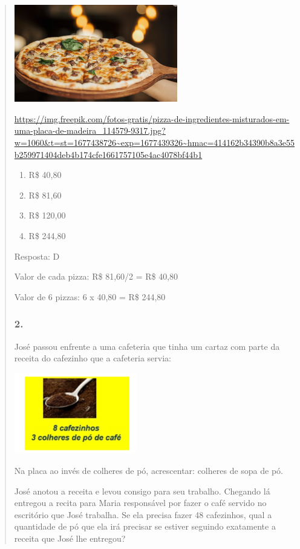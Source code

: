 \begin{enumerate}
\begin{escolha}
\begin{enumerate}
\begin{itemize}
\begin{itemize}
\begin{escolha}
\begin{quote}
\begin{escolha}
{\includegraphics[width=2.80000in,height=1.66867in]{media/image132.png}

\url{https://img.freepik.com/fotos-gratis/pizza-de-ingredientes-misturados-em-uma-placa-de-madeira_114579-9317.jpg?w=1060\&t=st=1677438726~exp=1677439326~hmac=414162b34390b8a3e55b259971404deb4b174cfe1661757105e4ac4078bf44b1}

\begin{enumerate}
\def\labelenumi{\alph{enumi})}
\item
  R\$ 40,80
\item
  R\$ 81,60
\item
  R\$ 120,00
\item
  R\$ 244,80
\end{enumerate}

Resposta: D

Valor de cada pizza: R\$ 81,60/2 = R\$ 40,80

Valor de 6 pizzas: 6 x 40,80 = R\$ 244,80

\subsubsection{2.}\label{section-128}

José passou enfrente a uma cafeteria que tinha um cartaz com parte da
receita do cafezinho que a cafeteria servia:

\includegraphics[width=2.10018in,height=1.39179in]{media/image133.png}

Na placa ao invés de colheres de pó, acrescentar: colheres de sopa de
pó.

José anotou a receita e levou consigo para seu trabalho. Chegando lá
entregou a recita para Maria responsável por fazer o café servido no
escritório que José trabalha. Se ela precisa fazer 48 cafezinhos, qual a
quantidade de pó que ela irá precisar se estiver seguindo exatamente a
receita que José lhe entregou?

}
\end{escolha}
\end{quote}
\end{escolha}
\end{itemize}
\end{itemize}
\end{enumerate}
\end{escolha}
\end{enumerate}
